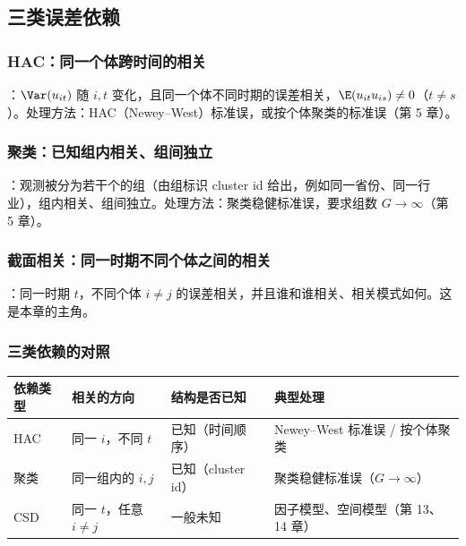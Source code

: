 \subsection{三类误差依赖}

\subsubsection{HAC：同一个体跨时间的相关}

：$\Var(u_{it})$ 随 $i,t$ 变化，且同一个体不同时期的误差相关，$\E(u_{it}u_{is})\neq0$（$t\neq s$）。处理方法：HAC（Newey--West）标准误，或按个体聚类的标准误（第 5 章）。

\subsubsection{聚类：已知组内相关、组间独立}

：观测被分为若干个的组（由组标识 cluster id 给出，例如同一省份、同一行业），组内相关、组间独立。处理方法：聚类稳健标准误，要求组数 $G\to\infty$（第 5 章）。

\subsubsection{截面相关：同一时期不同个体之间的相关}

：同一时期 $t$，不同个体 $i\neq j$ 的误差相关，并且谁和谁相关、相关模式如何。这是本章的主角。

\subsubsection{三类依赖的对照}

\begin{center}
\small
\begin{tabularx}{\linewidth}{@{}l l l L@{}}
\toprule
依赖类型 & 相关的方向 & 结构是否已知 & 典型处理\\
\midrule
HAC & 同一 $i$，不同 $t$ & 已知（时间顺序） & Newey--West 标准误 / 按个体聚类\\
聚类 & 同一组内的 $i,j$ & 已知（cluster id） & 聚类稳健标准误（$G\to\infty$）\\
CSD & 同一 $t$，任意 $i\neq j$ & 一般未知 & 因子模型、空间模型（第 13、14 章）\\
\bottomrule
\end{tabularx}
\label{tab:U13a-dep}
\end{center}

